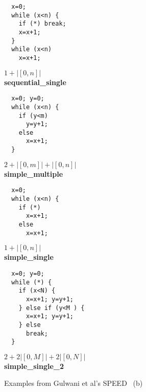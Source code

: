 \documentclass[nocopyrightspace,preprint]{sigplanconf}
\begin{document}
\begin{figure*}[t!]
 \setlength{\progwidth}{.24\linewidth}
  \centering
  \begin{minipage}[b]{\progwidth}
    \begin{center}
   \begin{lstlisting}
  x=0;
  while (x<n) {
    if (*) break;
    x=x+1;
  }
  while (x<n)
    x=x+1;
   \end{lstlisting}

$1 + |[0,n]|$
\\[.7\baselineskip]
      {\bf sequential\_single}
    \end{center}
  \end{minipage}
%
%
  \begin{minipage}[b]{\progwidth}
    \begin{center}
   \begin{lstlisting}
  x=0; y=0;
  while (x<n) {
    if (y<m)
      y=y+1;
    else
      x=x+1;
  }
   \end{lstlisting}
$2 + |[0, m]| + |[0, n]|$
\\[.7\baselineskip]
      {\bf simple\_multiple}
    \end{center}
  \end{minipage}
%
%
  \begin{minipage}[b]{\progwidth}
    \begin{center}
   \begin{lstlisting}
  x=0;
  while (x<n) {
    if (*)
      x=x+1;
    else 
      x=x+1;
   \end{lstlisting}

$1 + |[0,n]|$
\\[.7\baselineskip]
      {\bf simple\_single}
    \end{center}
  \end{minipage}
%
%
  \begin{minipage}[b]{\progwidth}
    \begin{center}
   \begin{lstlisting}
  x=0; y=0;
  while (*) {
    if (x<N) {
      x=x+1; y=y+1;
    } else if (y<M ) {
      x=x+1; y=y+1;
    } else
      break;
  }
   \end{lstlisting}

$2 + 2 |[0, M]| + 2 |[0, N]|$
\\[.7\baselineskip]
      {\bf simple\_single\_2}
    \end{center}
  \end{minipage}

   \caption{Examples from Gulwani et al's SPEED~\cite{GulwaniMC09} (b)}
  \label{fig:cat2b}
\end{figure*}
\end{document}

